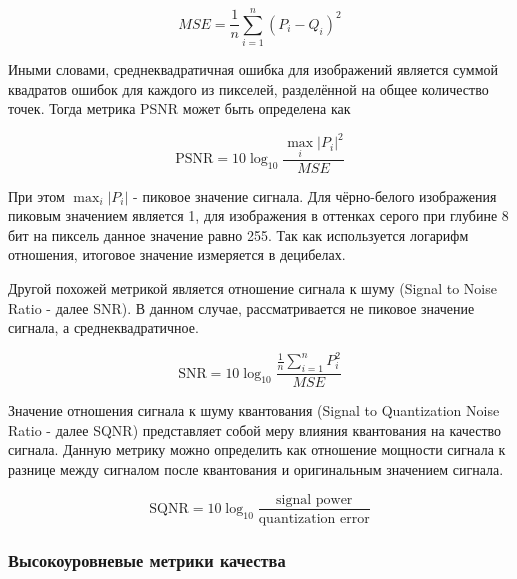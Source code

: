 \begin{equation} \label{eq:img_mse}
    MSE = \frac{1}{n} \sum_{i=1}^{n}\left(P_{i} - Q_{i}\right)^2
\end{equation}

Иными словами, среднеквадратичная ошибка для изображений является суммой
квадратов ошибок для каждого из пикселей, разделённой на общее количество точек.
Тогда метрика PSNR может быть определена как

\begin{equation} \label{eq:img_psnr}
    \text{PSNR} = 10\log_{10} \frac{\max_{i}\left|P_{i}\right|^{2}}{MSE}
\end{equation}

При этом $\max_{i}\left|P_{i}\right|$ - пиковое значение сигнала. Для
чёрно-белого изображения пиковым значением является 1, для изображения в
оттенках серого при глубине 8 бит на пиксель данное значение равно 255. Так как
используется логарифм отношения, итоговое значение измеряется в децибелах.


Другой похожей метрикой является отношение сигнала к шуму (Signal to Noise Ratio
- далее SNR). В данном случае, рассматривается не пиковое значение сигнала, а
среднеквадратичное.

\begin{equation} \label{eq:img_snr}
    \text{SNR} = 10\log_{10} \frac{\frac{1}{n}\sum_{i=1}^{n} P_{i}^{2}}{MSE}
\end{equation}

Значение отношения сигнала к шуму квантования (Signal to Quantization Noise
Ratio - далее SQNR) представляет собой меру влияния квантования на качество
сигнала. Данную метрику можно определить как отношение мощности сигнала к
разнице между сигналом после квантования и оригинальным значением сигнала.

\begin{equation} \label{eq:img_sqnr}
    \text{SQNR} = 10\log_{10} \frac{\text{signal power}}{\text{quantization error}}
\end{equation}

\subsubsection{Высокоуровневые метрики качества}


